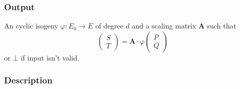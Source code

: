 \documentclass[12pt,a4paper]{article}
\begin{document}
		\subsubsection{Output}
		An cyclic isogeny $\varphi:E_0\to E$ of degree $d$ and a scaling matrix $\mathbf A$ such that
		\[
			\begin{pmatrix} S \\ T \end{pmatrix} = \mathbf A\cdot\varphi\begin{pmatrix} P \\ Q \end{pmatrix} 
		\] 
		or $\bot$ if input isn't valid.





		\subsubsection{Description}
\end{document}
